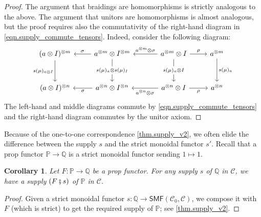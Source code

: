 \documentclass[11pt, oneside, article]{memoir}
\theoremstyle{plain}
\newtheorem{corollary}[theorem]{Corollary}
\theoremstyle{definition}
\theoremstyle{remark}
\newcommand{\cat}[1]{\mathcal{#1}}%
\newcommand{\Cat}[1]{{\mathsf{#1}}}%
\newcommand{\tpow}[1]{^{\otimes #1}}
\newcommand{\smf}{\Cat{SMF}}
\newcommand{\pp}{\mathbb{P}}
\newcommand{\qq}{\mathbb{Q}}
\newcommand{\mob}[1]{#1_0}
\newcommand{\cp}{\mathbin{\fatsemi}}
\begin{document}
\begin{proof}
The argument that braidings are homomorphisms is strictly analogous to the above. The argument that unitors are homomorphisms is almost analogous, but the proof requires also the commutativity of the right-hand diagram in \cref{eqn.supply_commute_tensors}. Indeed, consider the following diagram:
\[
\begin{tikzcd}[row sep=30pt]
	(a\otimes I)\tpow{m}\ar[d, "s(\mu)_{a\otimes I}"']&
	a\tpow{m}\otimes I\tpow{m}\ar[d, "s(\mu)_a\otimes s(\mu)_I" description]\ar[l, "\sigma"']&[10pt]
	a\tpow{m}\otimes I\ar[d, "s(\mu)_a\otimes I" description]\ar[r, "\rho"]\ar[l, "a\tpow{m}\otimes\sigma"']&
	a\tpow{m}\ar[d, "s(\mu)_a"]\\
	(a\otimes I)\tpow{n}&
	a\tpow{n}\otimes I\tpow{n}\ar[l, "\sigma"]&
	a\tpow{n}\otimes I\ar[l, "a\tpow{n}\otimes\sigma"]\ar[r, "\rho"']&
	a\tpow{n}
\end{tikzcd}
\]
The left-hand and middle diagrams commute by \cref{eqn.supply_commute_tensors} and the right-hand diagram commutes by the unitor axiom.
\end{proof}

Because of the one-to-one correspondence \cref{thm.supply_v2}, we often elide the difference between the supply $s$ and the strict monoidal functor $s'$. Recall that a prop functor $\pp\to\qq$ is a strict monoidal functor sending $1\mapsto 1$.

\begin{corollary}\label{cor.change_of_supply}
Let $F\colon\pp\to\qq$ be a prop functor. For any supply $s$ of $\qq$ in $\cat{C}$, we have a supply $(F\cp s)$ of $\pp$ in $\cat{C}$.
\end{corollary}
\begin{proof}
Given a strict monoidal functor $s\colon\qq\to\smf(\mob{\cat{C}},\cat{C})$, we compose it with $F$ (which is strict) to get the required supply of $\pp$; see \cref{thm.supply_v2}.
\end{proof}
\end{document}

